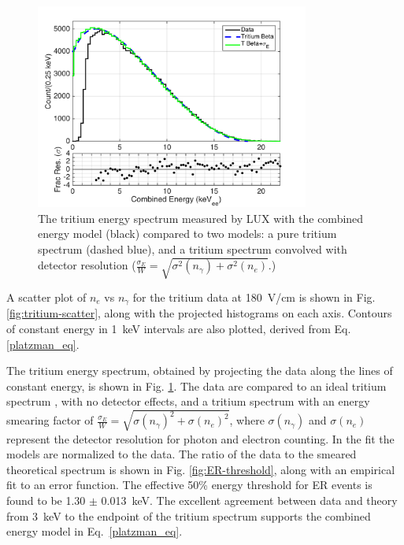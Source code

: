 \begin{figure}[h!]
\begin{center}
\includegraphics[width=90mm]{fig/tritium-spectrum-linear.png}
\caption{The tritium energy spectrum measured by LUX with the combined energy model (black) compared to two models: a pure tritium spectrum (dashed blue), and a tritium spectrum convolved with detector resolution  ($\frac{\sigma_E}{W} = \sqrt{\sigma^2(n_{\gamma})+ \sigma^2(n_e)}$.) }
\label{fig:tritium-spectrum}
\end{center}
\end{figure}


A scatter plot of $n_e$ vs $n_{\gamma}$ for the tritium data at 180~V/cm is shown in Fig. \ref{fig:tritium-scatter}, along with the projected histograms on each axis. Contours of constant energy in 1~keV intervals are also plotted, derived from Eq. \ref{platzman_eq}. 


The tritium energy spectrum, obtained by projecting the data along the lines of constant energy, is shown in Fig. \ref{fig:tritium-spectrum}. The data are compared to an ideal tritium spectrum \cite{Tritium_Eq_Simpson}, with no detector effects, and a tritium spectrum with an energy smearing factor of $ \frac{\sigma_E}{W} = \sqrt{\sigma(n_{\gamma})^2 + \sigma(n_e)^2}$, where $ \sigma(n_{\gamma})$ and $ \sigma(n_e)$ represent the detector resolution for photon and electron counting. In the fit the models are normalized to the data. The ratio of the data to the smeared theoretical spectrum is shown in Fig. \ref{fig:ER-threshold}, along with an empirical fit to an error function. The effective 50\% energy threshold for ER events is found to be 1.30 $\pm$ 0.013~keV. The excellent agreement between data and theory from 3~keV to the endpoint of the tritium spectrum supports the combined energy model in Eq.~\ref{platzman_eq}.

